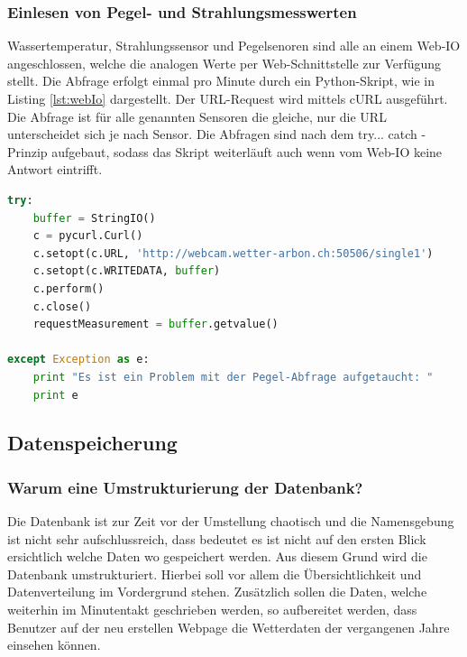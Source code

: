 \subsubsection{Einlesen von Pegel- und Strahlungsmesswerten}
Wassertemperatur, Strahlungssensor und Pegelsenoren sind alle an einem Web-IO angeschlossen, welche die analogen Werte per Web-Schnittstelle zur Verfügung stellt. Die Abfrage erfolgt einmal pro Minute durch ein Python-Skript, wie in Listing \ref{lst:webIo} dargestellt. Der URL-Request wird mittels cURL ausgeführt. Die Abfrage ist für alle genannten Sensoren die gleiche, nur die URL unterscheidet sich je nach Sensor. Die Abfragen sind nach dem try... catch - Prinzip aufgebaut, sodass das Skript weiterläuft auch wenn vom Web-IO keine Antwort eintrifft.

\begin{lstlisting}[label=lst:webIo,caption=Web-Abfrage des Pegel-Messwerts, language=python, style=py]
try:
    buffer = StringIO()
    c = pycurl.Curl()
    c.setopt(c.URL, 'http://webcam.wetter-arbon.ch:50506/single1')
    c.setopt(c.WRITEDATA, buffer)
    c.perform()
    c.close()
    requestMeasurement = buffer.getvalue()

except Exception as e:
    print "Es ist ein Problem mit der Pegel-Abfrage aufgetaucht: "
    print e
\end{lstlisting}


\subsection{Datenspeicherung}
\subsubsection{Warum eine Umstrukturierung der Datenbank?}
Die Datenbank ist zur Zeit vor der Umstellung chaotisch und die Namensgebung ist nicht sehr aufschlussreich, dass bedeutet es ist nicht auf den ersten Blick ersichtlich welche Daten wo gespeichert werden. Aus diesem Grund wird die Datenbank umstrukturiert. Hierbei soll vor allem die Übersichtlichkeit und Datenverteilung im Vordergrund stehen. Zusätzlich sollen die Daten, welche weiterhin im Minutentakt geschrieben werden, so aufbereitet werden, dass Benutzer auf der neu erstellen Webpage die Wetterdaten der vergangenen Jahre einsehen können.

